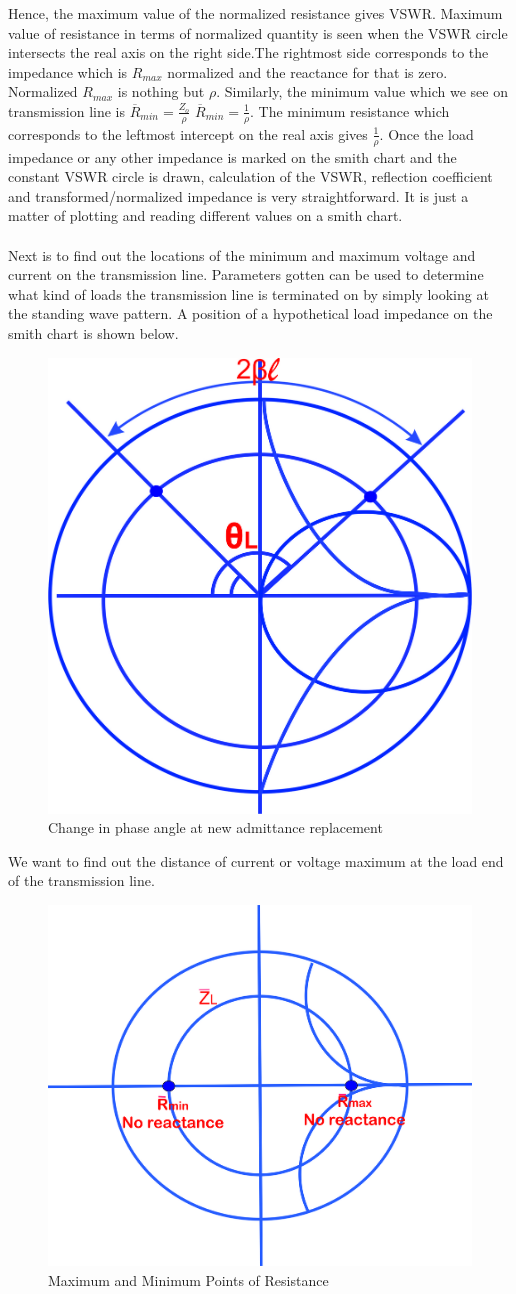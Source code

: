 Hence, the maximum value of the normalized resistance gives VSWR. Maximum value of resistance in terms of normalized quantity is seen when the VSWR circle intersects the real axis on the right side.The rightmost side corresponds to the impedance which is $R_{max}$ normalized and the reactance for that is zero. Normalized $R_{max}$ is nothing but $\rho$. Similarly, the minimum value which we see on transmission line is $\overline{R}_{min} = \frac{Z_o}{\rho}$ $\overline{R}_{min} = \frac{1}{\rho}$. The minimum resistance which corresponds to the leftmost intercept on the real axis gives $\frac{1}{\rho}$. Once the load impedance or any other impedance is marked on the smith chart and the constant VSWR circle is drawn, calculation of the VSWR, reflection coefficient and transformed/normalized impedance is very straightforward. It is just a matter of plotting and reading different values on a smith chart.\\\\
Next is to find out the locations of the  minimum and maximum voltage and current on the transmission line. Parameters gotten can be used to determine what kind of loads the transmission line is terminated on by simply looking at the standing wave pattern. A position of a hypothetical load impedance on the smith chart is shown below.
\begin{figure}[h]
\centering
\includegraphics[width=0.4\linewidth]{./graphics/dfyui}
\caption{Change in phase angle at new admittance replacement}
\label{fig:dfyui}
\end{figure}


We want to find out the distance of current or voltage maximum at the load end of the transmission line.
\begin{figure}[h]
\centering
\includegraphics[width=0.7\linewidth]{./graphics/oijhgfdsa}
\caption{Maximum and Minimum Points of Resistance}
\label{fig:oijhgfdsa}
\end{figure}

